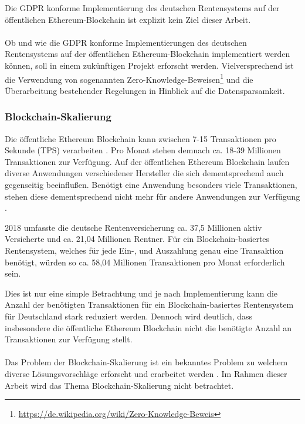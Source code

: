 Die GDPR konforme Implementierung des deutschen Rentensystems auf der öffentlichen Ethereum-Blockchain ist explizit kein Ziel dieser Arbeit.

\paragraph*{}
Ob und wie die GDPR konforme Implementierungen des deutschen Rentensystems auf der öffentlichen Ethereum-Blockchain implementiert werden können, soll in einem zukünftigen Projekt erforscht werden. Vielversprechend ist die Verwendung von sogenannten Zero-Knowledge-Beweisen\footnote{\url{https://de.wikipedia.org/wiki/Zero-Knowledge-Beweis}} und die Überarbeitung bestehender Regelungen in Hinblick auf die Datensparsamkeit.

\subsubsection{Blockchain-Skalierung}
Die öffentliche Ethereum Blockchain kann zwischen 7-15 Transaktionen pro Sekunde (TPS) verarbeiten \cite{vitalikscale}. Pro Monat stehen demnach ca. 18-39 Millionen Transaktionen zur Verfügung. Auf der öffentlichen Ethereum Blockchain laufen diverse Anwendungen verschiedener Hersteller die sich dementsprechend auch gegenseitig beeinflußen. Benötigt eine Anwendung besonders viele Transaktionen, stehen diese dementsprechend nicht mehr für andere Anwendungen zur Verfügung \cite{cryptokitty}.  

2018 umfasste die deutsche Rentenversicherung ca. 37,5 Millionen aktiv Versicherte und ca. 21,04 Millionen Rentner. \cite{rente2018,rentezahlen2019} Für ein Blockchain-basiertes Rentensystem, welches für jede Ein-, und Auszahlung genau eine Transaktion benötigt, würden so ca. 58,04 Millionen Transaktionen pro Monat erforderlich sein.

Dies ist nur eine simple Betrachtung und je nach Implementierung kann die Anzahl der benötigten Transaktionen für ein Blockchain-basiertes Rentensystem für Deutschland stark reduziert werden. Dennoch wird deutlich, dass insbesondere die öffentliche Ethereum Blockchain nicht die benötigte Anzahl an Transaktionen zur Verfügung stellt.

\paragraph*{}
Das Problem der Blockchain-Skalierung ist ein bekanntes Problem zu welchem diverse Lösungsvorschläge erforscht und erarbeitet werden \cite{scaling}. Im Rahmen dieser Arbeit wird das Thema Blockchain-Skalierung nicht betrachtet.

